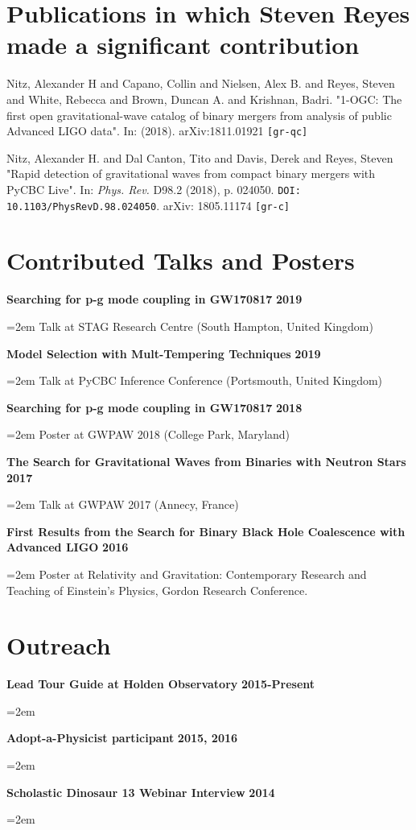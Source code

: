 \documentclass[paper=a4,fontsize=11pt]{scrartcl} %
\newcommand{\NewPart}[1]{\section*{#1}}
\newcommand{\ContributedTalksEntry}[3]{
         \noindent \textbf{#1} \hfill %
         \noindent \textbf{#2} \par %
         \noindent\hangindent=2em\hangafter=0 \small #3 %
		 \normalsize \par
         }
\newcommand{\Outreach}[3]{
        \noindent \textbf{#1} \hfill
        \noindent \textbf{#2} \par
        \noindent\hangindent=2em\hangafter=0 \small #3 %
		\normalsize \par}
\begin{document}
\NewPart{Publications in which Steven Reyes made a significant contribution}{
     \noindent \textit{}
     \newline \par
     \noindent Nitz, Alexander H and Capano, Collin and Nielsen, Alex
                        B. and Reyes, Steven and White, Rebecca and Brown, Duncan
                        A. and Krishnan, Badri. "1-OGC: The first open gravitational-wave catalog of
                        binary mergers from analysis of public Advanced LIGO
                        data". In: (2018). arXiv:1811.01921 \texttt{[gr-qc]}
     \newline \par
     \noindent \cite{Reyes:2018bee}
     \newline \par
     \noindent Nitz, Alexander H. and Dal Canton, Tito and Davis, Derek
                        and Reyes, Steven "Rapid detection of gravitational waves from compact binary
                        mergers with PyCBC Live". In: \textit{Phys. Rev.} D98.2 (2018), p. 024050. \texttt{DOI: 10.1103/PhysRevD.98.024050}. arXiv: 1805.11174 \texttt{[gr-c]}
     \newline \par
     \noindent \cite{Abbott:2016ymx}

     }
\nocite{*}

\NewPart{Contributed Talks and Posters}{}
\ContributedTalksEntry{Searching for p-g mode coupling in GW170817}{2019}{Talk at STAG Research Centre (South Hampton, United Kingdom)}
\ContributedTalksEntry{Model Selection with Mult-Tempering Techniques}{2019}{Talk at PyCBC Inference Conference (Portsmouth, United Kingdom)}
\ContributedTalksEntry{Searching for p-g mode coupling in GW170817}{2018}{Poster at GWPAW 2018 (College Park, Maryland)}
\ContributedTalksEntry{The Search for Gravitational Waves from Binaries with Neutron Stars}{2017}{Talk at GWPAW 2017 (Annecy, France)}
\ContributedTalksEntry{First Results from the Search for Binary Black Hole Coalescence
with Advanced LIGO}{2016}{Poster at Relativity and Gravitation: Contemporary Research and Teaching of Einstein's Physics, Gordon Research Conference.}

\NewPart{Outreach}{}
\Outreach{Lead Tour Guide at Holden Observatory}{2015-Present}
{}

\Outreach{Adopt-a-Physicist participant}{2015, 2016}
{}

\Outreach{Scholastic Dinosaur 13 Webinar Interview}{2014}{}

\printbibliography[title=Full Publication List, type=article]
\end{document}
